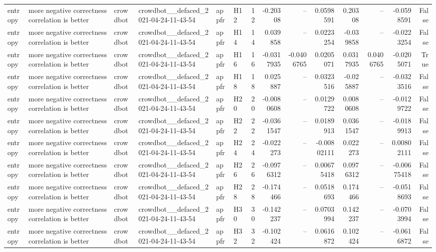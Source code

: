 \begin{longtable}{llllllrrrrrrrr}
entropy & more negative correctness correlation is better & crowdbot & crowdbot\_\_defaced\_2021-04-24-11-43-54 & appfr & H12 & 12 & -0.20308 & -- & 0.0598591 & 0.20308 & -- & -0.0598591 & False \\
entropy & more negative correctness correlation is better & crowdbot & crowdbot\_\_defaced\_2021-04-24-11-43-54 & appfr & H14 & 14 & 0.039858 & -- & 0.0223254 & -0.039858 & -- & -0.0223254 & False \\
entropy & more negative correctness correlation is better & crowdbot & crowdbot\_\_defaced\_2021-04-24-11-43-54 & appfr & H16 & 16 & -0.0317935 & -0.0406765 & 0.0205071 & 0.0317935 & 0.0406765 & -0.0205071 & True \\
entropy & more negative correctness correlation is better & crowdbot & crowdbot\_\_defaced\_2021-04-24-11-43-54 & appfr & H18 & 18 & 0.025887 & -- & 0.0323516 & -0.025887 & -- & -0.0323516 & False \\
entropy & more negative correctness correlation is better & crowdbot & crowdbot\_\_defaced\_2021-04-24-11-43-54 & appfr & H20 & 20 & -0.0080608 & -- & 0.0129722 & 0.0080608 & -- & -0.0129722 & False \\
entropy & more negative correctness correlation is better & crowdbot & crowdbot\_\_defaced\_2021-04-24-11-43-54 & appfr & H22 & 22 & -0.0361547 & -- & 0.0189913 & 0.0361547 & -- & -0.0189913 & False \\
entropy & more negative correctness correlation is better & crowdbot & crowdbot\_\_defaced\_2021-04-24-11-43-54 & appfr & H24 & 24 & -0.022273 & -- & -0.00802111 & 0.022273 & -- & 0.00802111 & False \\
entropy & more negative correctness correlation is better & crowdbot & crowdbot\_\_defaced\_2021-04-24-11-43-54 & appfr & H26 & 26 & -0.0976312 & -- & 0.00675418 & 0.0976312 & -- & -0.00675418 & False \\
entropy & more negative correctness correlation is better & crowdbot & crowdbot\_\_defaced\_2021-04-24-11-43-54 & appfr & H28 & 28 & -0.174466 & -- & 0.0518693 & 0.174466 & -- & -0.0518693 & False \\
entropy & more negative correctness correlation is better & crowdbot & crowdbot\_\_defaced\_2021-04-24-11-43-54 & appfr & H30 & 30 & -0.142237 & -- & 0.0703994 & 0.142237 & -- & -0.0703994 & False \\
entropy & more negative correctness correlation is better & crowdbot & crowdbot\_\_defaced\_2021-04-24-11-43-54 & appfr & H32 & 32 & -0.102424 & -- & 0.0616872 & 0.102424 & -- & -0.0616872 & False \\

\end{longtable}
